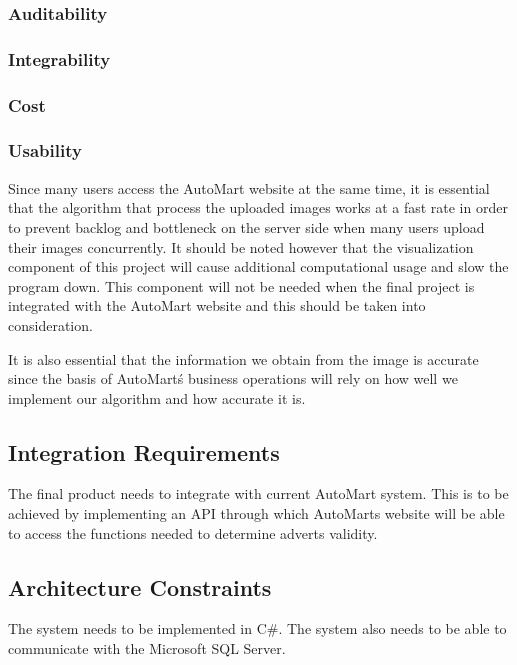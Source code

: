 \subsubsection{Auditability}

\subsubsection{Integrability}

\subsubsection{Cost}

\subsubsection{Usability}


Since many users access the AutoMart website at the same time, it is essential that the algorithm that process the uploaded images works at a fast rate in order to prevent backlog and bottleneck on the server side when many users upload their images concurrently. It should be noted however that the visualization component of this project will cause additional computational usage and slow the program down. This component will not be needed when the final project is integrated with the AutoMart website and this should be taken into consideration.

It is also essential that the information we obtain from the image is accurate since the basis of AutoMart\'s business operations will rely on how well we implement our algorithm and how accurate it is.

\subsection{Integration Requirements}
The final product needs to integrate with current AutoMart system. This is to be achieved by implementing an API through which AutoMarts website will be able to access the functions needed to determine adverts validity.

\subsection{Architecture Constraints}
The system needs to be implemented in C\#. The system also needs to be able to communicate with the Microsoft SQL Server.